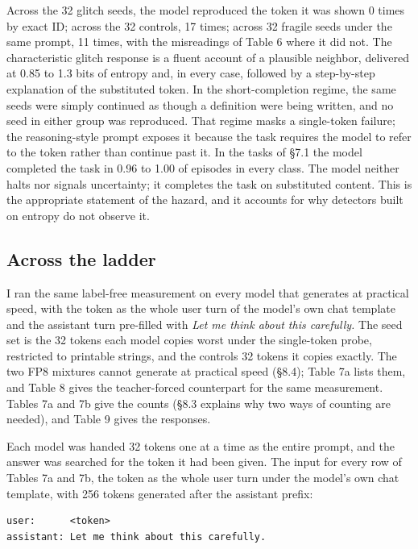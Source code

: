 \documentclass[11pt]{article}
\begin{document}
Across the 32 glitch seeds, the model reproduced the token it was shown 0 times by exact ID; across the 32 controls, 17 times; across 32 fragile seeds under the same prompt, 11 times, with the misreadings of Table 6 where it did not. The characteristic glitch response is a fluent account of a plausible neighbor, delivered at 0.85 to 1.3 bits of entropy and, in every case, followed by a step-by-step explanation of the substituted token. In the short-completion regime, the same seeds were simply continued as though a definition were being written, and no seed in either group was reproduced. That regime masks a single-token failure; the reasoning-style prompt exposes it because the task requires the model to refer to the token rather than continue past it. In the tasks of §7.1 the model completed the task in 0.96 to 1.00 of episodes in every class. The model neither halts nor signals uncertainty; it completes the task on substituted content. This is the appropriate statement of the hazard, and it accounts for why detectors built on entropy do not observe it.

\subsection{Across the ladder}\label{across-the-ladder}

I ran the same label-free measurement on every model that generates at practical speed, with the token as the whole user turn of the model's own chat template and the assistant turn pre-filled with \emph{Let me think about this carefully.} The seed set is the 32 tokens each model copies worst under the single-token probe, restricted to printable strings, and the controls 32 tokens it copies exactly. The two FP8 mixtures cannot generate at practical speed (§8.4); Table 7a lists them, and Table 8 gives the teacher-forced counterpart for the same measurement. Tables 7a and 7b give the counts (§8.3 explains why two ways of counting are needed), and Table 9 gives the responses.

Each model was handed 32 tokens one at a time as the entire prompt, and the answer was searched for the token it had been given. The input for every row of Tables 7a and 7b, the token as the whole user turn under the model's own chat template, with 256 tokens generated after the assistant prefix:

\begin{Verbatim}[breaklines=true,breakanywhere=true,fontsize=\small]
user:      <token>
assistant: Let me think about this carefully.
\end{Verbatim}
\end{document}
